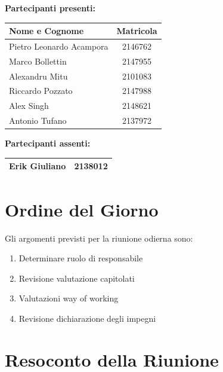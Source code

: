 \documentclass[a4paper, 11pt]{article}
\begin{document}
\vspace{0.5cm}
\textbf{Partecipanti presenti:} \\
\vspace{0.2cm}
\renewcommand{\arraystretch}{1.2}
\begin{tabularx}{0.8\textwidth}{|X|c|}
\hline
\textbf{Nome e Cognome} & \textbf{Matricola} \\ \hline
Pietro Leonardo Acampora & 2146762 \\ \hline
Marco Bollettin & 2147955 \\ \hline
Alexandru Mitu & 2101083 \\ \hline
Riccardo Pozzato & 2147988 \\ \hline
Alex Singh & 2148621 \\ \hline
Antonio Tufano & 2137972 \\ \hline
\end{tabularx}

\vspace{0.5cm}
\textbf{Partecipanti assenti:} \\
\vspace{0.2cm}
\renewcommand{\arraystretch}{1.2}
\begin{tabularx}{0.8\textwidth}{|X|c|}
\hline
\textbf{Erik Giuliano} & \textbf{2138012} \\ \hline
\end{tabularx}

\section{Ordine del Giorno}
Gli argomenti previsti per la riunione odierna sono:
\begin{enumerate}
    \item Determinare ruolo di responsabile
    \item Revisione valutazione capitolati
    \item Valutazioni way of working
    \item Revisione dichiarazione degli impegni
\end{enumerate}

\section{Resoconto della Riunione}
\end{document}
